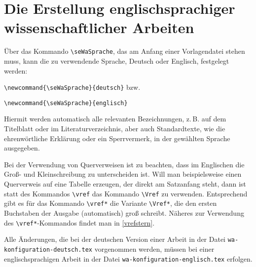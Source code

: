 \chapter{Die Erstellung englischsprachiger wissenschaftlicher Arbeiten}

\"Uber das Kommando \verb+\seWaSprache+, das am Anfang einer Vorlagendatei stehen muss,
kann die zu verwendende Sprache, Deutsch oder Englisch, festgelegt werden:

\begin{seList}
\item \verb+\newcommand{\seWaSprache}{deutsch}+  bzw.
\item \verb+\newcommand{\seWaSprache}{englisch}+
\end{seList}

Hiermit werden automatisch alle relevanten Bezeichnungen, z.\,B. auf dem Titelblatt oder im Literaturverzeichnis, aber auch Standardtexte,  
wie die ehrenw\"ortliche Erkl\"arung oder ein Sperrvermerk, in der gew\"ahlten Sprache ausgegeben.

Bei der Verwendung von Querverweisen ist zu beachten, dass im Englischen die Gro{\ss}- und Kleinschreibung zu unterscheiden ist. 
Will man beispielsweise einen Querverweis auf eine Tabelle erzeugen, der direkt am Satzanfang steht, dann ist statt des 
Kommandos \verb+\vref+ das Kommando \verb+\Vref+ zu verwenden. Entsprechend gibt es f\"ur das Kommando \verb+\vref*+ 
die Variante \verb+\Vref*+, die den ersten Buchstaben der Ausgabe (automatisch) gro{\ss} schreibt. N\"aheres zur Verwendung des 
\verb+\vref*+-Kommandos findet man in \vref{vrefstern}.

Alle \"Anderungen, die bei der deutschen Version einer Arbeit in der Datei \newline
\hspace*{\fill}\verb+wa-konfiguration-deutsch.tex+\hspace*{\fill}\newline
vorgenommen werden, m\"ussen bei einer englischsprachigen Arbeit in der Datei \newline 
\hspace*{\fill}\verb+wa-konfiguration-englisch.tex+\hspace*{\fill}\newline
erfolgen.